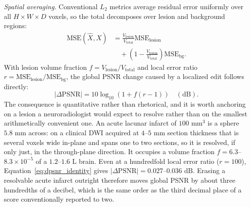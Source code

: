 \documentclass[review,authoryear]{elsarticle}
\begin{document}
\emph{Spatial averaging.} Conventional $L_2$ metrics average residual error uniformly
over all $H\times W\times D$ voxels, so the total decomposes over lesion and background
regions:
\begin{equation}
\begin{aligned}
\text{MSE}(\hat{X}, X) &= \frac{V_{\text{lesion}}}{V_{\text{total}}}
\text{MSE}_{\text{lesion}} \\
&\quad + \left(1 - \frac{V_{\text{lesion}}}{V_{\text{total}}}\right)
\text{MSE}_{\text{bg}}.
\end{aligned}
\end{equation}
With lesion volume fraction $f = V_{\text{lesion}}/V_{\text{total}}$ and local error ratio
$r = \text{MSE}_{\text{lesion}}/\text{MSE}_{\text{bg}}$, the global PSNR change caused by a
localized edit follows directly:
\begin{equation}
\label{eq:dpsnr_identity}
|\Delta\mathrm{PSNR}| = 10\log_{10}\left(1 + f(r - 1)\right) \quad (\text{dB}).
\end{equation}
The consequence is quantitative rather than rhetorical, and it is worth anchoring on a
lesion a neuroradiologist would expect to resolve rather than on the smallest
arithmetically convenient one. An acute lacunar infarct of $100\text{ mm}^3$ is a sphere
$5.8\text{ mm}$ across: on a clinical DWI acquired at $4$--$5\text{ mm}$ section
thickness \citep{lang2024ultrafast} that is several voxels wide in-plane and spans one
to two sections, so it is resolved, if only just, in the through-plane direction. It
occupies a volume fraction
$f = 6.3$--$8.3\times10^{-5}$ of a $1.2$--$1.6\text{ L}$ brain. Even at a hundredfold
local error ratio ($r=100$), Equation~\eqref{eq:dpsnr_identity} gives
$|\Delta\mathrm{PSNR}| = 0.027$--$0.036\text{ dB}$. Erasing a resolvable acute infarct
outright therefore moves global PSNR by about three hundredths of a decibel, which is
the same order as the third decimal place of a score conventionally reported to two.
\end{document}

